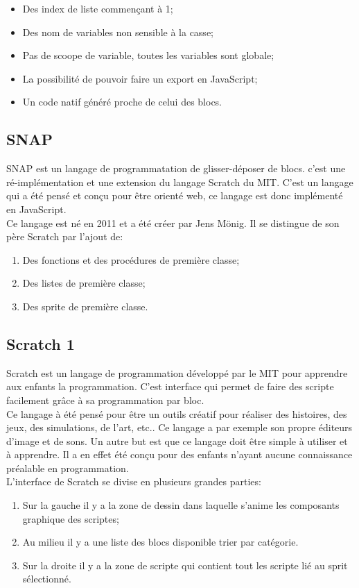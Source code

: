 \begin{itemize}
  \item Des index de liste commençant à 1;
  \item Des nom de variables non sensible à la casse;
  \item Pas de scoope de variable, toutes les variables sont globale;
  \item La possibilité de pouvoir faire un export en JavaScript;
  \item Un code natif généré proche de celui des blocs.
\end{itemize}

\subsection{SNAP}
SNAP est un langage de programmatation de glisser-déposer de blocs. c'est une ré-implémentation et une extension du langage Scratch du MIT. C'est un langage qui a été pensé et conçu pour être orienté web, ce langage est donc implémenté en JavaScript.\\

Ce langage est né en 2011 et a été créer par Jens Mönig. Il se distingue de son père Scratch par l'ajout de:
\begin{enumerate}
\item Des fonctions et des procédures de première classe;
\item Des listes de première classe;
\item Des sprite de première classe.
\end{enumerate}

\subsection{Scratch 1}
Scratch est un langage de programmation développé par le MIT pour apprendre aux enfants la programmation. C'est interface qui permet de faire des scripte facilement grâce à sa programmation par bloc.\\

Ce langage à été pensé pour être un outils créatif pour réaliser des histoires, des jeux, des simulations, de l'art, etc.. Ce langage a par exemple son propre éditeurs d'image et de sons. Un autre but est que ce langage doit être simple à utiliser et à apprendre. Il a en effet été conçu pour des enfants n'ayant aucune connaissance préalable en programmation.\\

L'interface de Scratch se divise en plusieurs grandes parties:
\begin{enumerate}
\item Sur la gauche il y a la zone de dessin dans laquelle s'anime les composants graphique des scriptes;
\item Au milieu il y a une liste des blocs disponible trier par catégorie.
\item Sur la droite il y a la zone de scripte qui contient tout les scripte lié au sprit sélectionné.
\end{enumerate}

